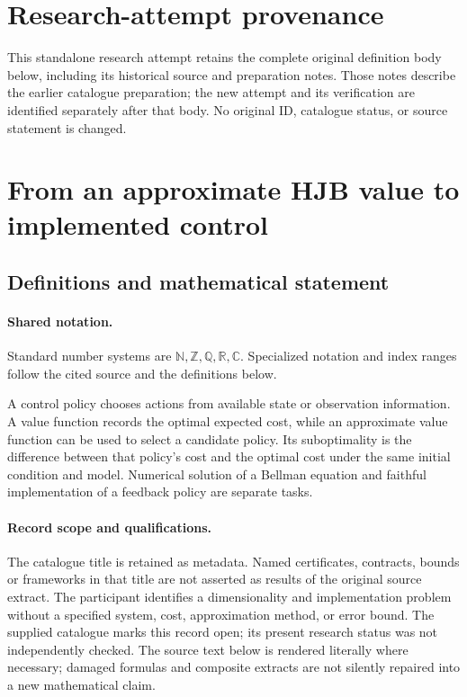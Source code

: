 \documentclass[11pt]{article}
\begin{document}
\section*{Research-attempt provenance}
This standalone research attempt retains the complete original definition body below,
including its historical source and preparation notes. Those notes describe the
earlier catalogue preparation; the new attempt and its verification are identified
separately after that body. No original ID, catalogue status, or source statement is changed.

\section{From an approximate HJB value to implemented control}\label{statement}

\subsection{Definitions and mathematical statement}

\paragraph{Shared notation.}Standard number systems are $\mathbb N,\mathbb Z,\mathbb Q,\mathbb R,\mathbb C$. Specialized notation and index ranges follow the cited source and the definitions below.


A control policy chooses actions from available state or observation information. A value function records the optimal expected cost, while an approximate value function can be used to select a candidate policy. Its suboptimality is the difference between that policy's cost and the optimal cost under the same initial condition and model. Numerical solution of a Bellman equation and faithful implementation of a feedback policy are separate tasks.
\paragraph{Record scope and qualifications.}
The catalogue title is retained as metadata. Named certificates, contracts, bounds or frameworks in that title are not asserted as results of the original source extract.
The participant identifies a dimensionality and implementation problem without a specified system, cost, approximation method, or error bound. The supplied catalogue marks this record open; its present research status was not independently checked.
The source text below is rendered literally where necessary; damaged formulas and composite extracts are not silently repaired into a new mathematical claim.
\end{document}
